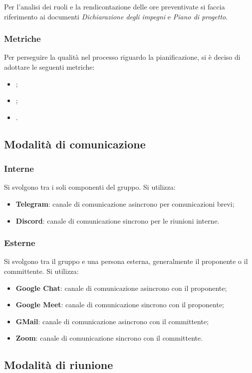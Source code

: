 Per l'analisi dei ruoli e la rendicontazione delle ore preventivate si faccia
riferimento ai documenti \textit{Dichiarazione degli impegni} e \textit{Piano
    di progetto}.

\subsubsection{Metriche}
Per perseguire la qualità nel processo riguardo la pianificazione, si è deciso
di adottare le seguenti metriche:
\begin{itemize}
    \item {};
    \item {};
    \item {}.
\end{itemize}

\subsection{Modalità di comunicazione}
\subsubsection{Interne}
Si svolgono tra i soli componenti del gruppo. Si utilizza:
\begin{itemize}
    \item \textbf{Telegram}: canale di comunicazione asincrono per comunicazioni brevi;
    \item \textbf{Discord}: canale di comunicazione sincrono per le riunioni interne.
\end{itemize}
\subsubsection{Esterne}
Si svolgono tra il gruppo e una persona esterna, generalmente il proponente
o il committente. Si utilizza:
\begin{itemize}
    \item \textbf{Google Chat}: canale di comunicazione asincrono con il proponente;
    \item \textbf{Google Meet}: canale di comunicazione sincrono con il proponente;
    \item \textbf{GMail}: canale di comunicazione asincrono con il committente;
    \item \textbf{Zoom}: canale di comunicazione sincrono con il committente.
\end{itemize}

\subsection{Modalità di riunione}
